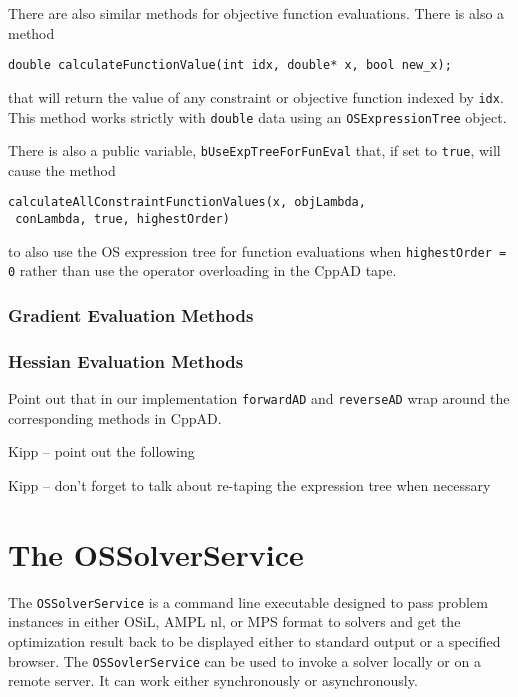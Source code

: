 \documentclass[11pt]{article}
\renewcommand{\_}{{\char"5F}}
\renewcommand{\{}{{\char"7B}}
\renewcommand{\}}{{\char"7D}}
\renewcommand{\^}{{\char"0D}}
\renewcommand{\'}{{\char"0D}}
\begin{document}
There are also similar methods for objective function evaluations.  There is also a method
\begin{verbatim}
double calculateFunctionValue(int idx, double* x, bool new_x);
\end{verbatim}
that will return the value of any constraint or objective function indexed by {\tt idx}. This method works strictly with {\tt double} data using an {\tt OSExpressionTree} object.

There is also a public variable, {\tt bUseExpTreeForFunEval} that, if set to {\tt true}, will cause the method
\begin{verbatim}
calculateAllConstraintFunctionValues(x, objLambda, 
 conLambda, true, highestOrder)
\end{verbatim}
to also use the OS expression tree for function evaluations when {\tt highestOrder = 0} rather than use the operator overloading in the CppAD tape.

\subsubsection{Gradient Evaluation Methods}

\subsubsection{Hessian Evaluation Methods}

Point out that in our implementation {\tt forwardAD} and {\tt reverseAD} wrap around the corresponding methods in CppAD. 

Kipp --  point out the following


Kipp -- don't forget to talk about re-taping the expression tree when necessary


\section{The OSSolverService}\label{section:ossolverservice}

The {\tt OSSolverService} is a command line executable designed to pass problem instances in either  OSiL, AMPL nl, or MPS format  to solvers and get the optimization result back to be displayed either to standard output or a specified browser.  The {\tt OSSovlerService} can be used to invoke a solver locally or on a remote server. It can work either synchronously or asynchronously. 
\end{document}
